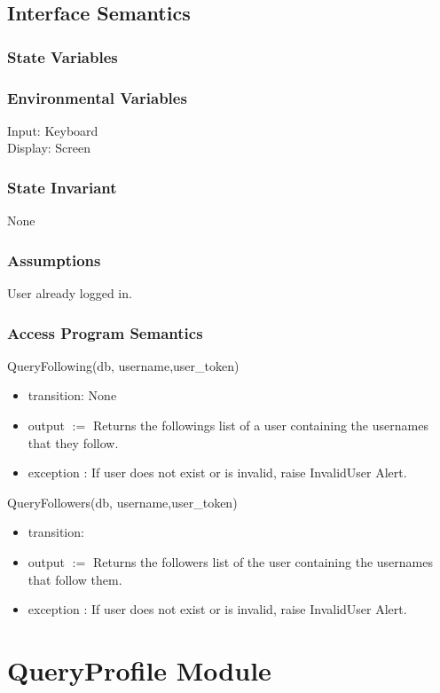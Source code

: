 \documentclass[12pt, titlepage]{article}
\begin{document}
\subsection{Interface Semantics}
\subsubsection{State Variables}

\subsubsection{Environmental Variables}
Input: Keyboard\\
Display: Screen


\subsubsection{State Invariant}
None

\subsubsection{Assumptions}
User already logged in.

\subsubsection{Access Program Semantics}
QueryFollowing(db, username,user\_token)
\begin{itemize}
    \item transition: None
    \item output $:= $ Returns the followings list of a user containing the usernames that they follow.
    \item exception : If user does not exist or is invalid, raise InvalidUser Alert.
\end{itemize}

QueryFollowers(db, username,user\_token)
\begin{itemize}
    \item transition: 
    \item output $:= $ Returns the followers list of the user containing the usernames that follow them.
    \item exception : If user does not exist or is invalid, raise InvalidUser Alert.
\end{itemize}






\newpage
\section* {QueryProfile Module}
\end{document}

